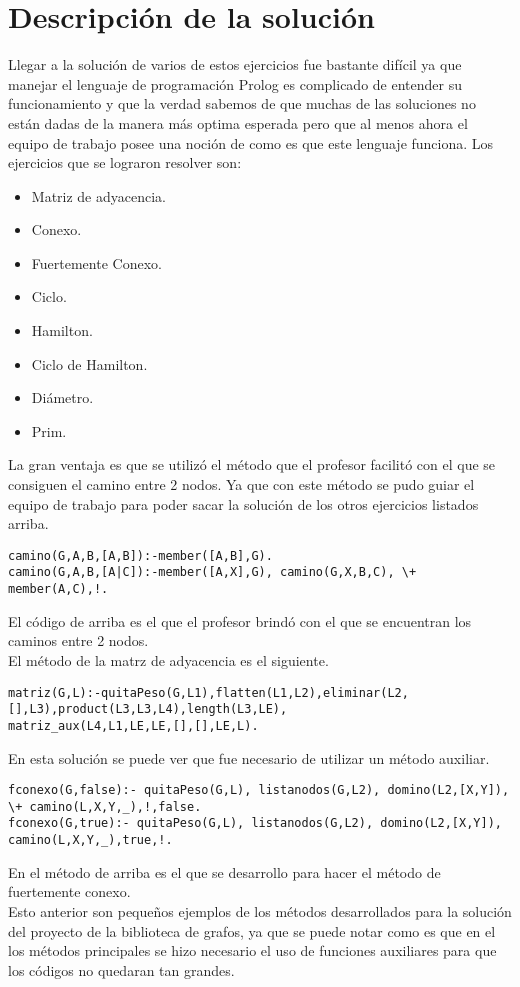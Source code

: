 \documentclass[10pt,a4paper]{article}
\begin{document}
\section{Descripción de la solución}
Llegar a la solución de varios de estos ejercicios fue bastante difícil ya que manejar el lenguaje de programación Prolog es complicado de entender su funcionamiento y que la verdad sabemos de que muchas de las soluciones no están dadas de la manera más optima esperada pero que al menos ahora el equipo de trabajo posee una noción de como es que este lenguaje funciona. Los ejercicios que se lograron resolver son:
\begin{itemize}
\item Matriz de adyacencia.
\item Conexo.
\item Fuertemente Conexo.
\item Ciclo.
\item Hamilton.
\item Ciclo de Hamilton.
\item Diámetro.
\item Prim.
\end{itemize}
La gran ventaja es que se utilizó el método que el profesor facilitó con el que se consiguen el camino entre 2 nodos. Ya que con este método se pudo guiar el equipo de trabajo para poder sacar la solución de los otros ejercicios listados arriba. 
\begin{verbatim}
camino(G,A,B,[A,B]):-member([A,B],G).
camino(G,A,B,[A|C]):-member([A,X],G), camino(G,X,B,C), \+ member(A,C),!.
\end{verbatim}
El código de arriba es el que el profesor brindó con el que se encuentran los caminos entre 2 nodos.\\
El método de la matrz de adyacencia es el siguiente.
\begin{verbatim}
matriz(G,L):-quitaPeso(G,L1),flatten(L1,L2),eliminar(L2,[],L3),product(L3,L3,L4),length(L3,LE),
matriz_aux(L4,L1,LE,LE,[],[],LE,L).
\end{verbatim}
En esta solución se puede ver que fue necesario de utilizar un método auxiliar. 
\begin{verbatim}
fconexo(G,false):- quitaPeso(G,L), listanodos(G,L2), domino(L2,[X,Y]), \+ camino(L,X,Y,_),!,false.
fconexo(G,true):- quitaPeso(G,L), listanodos(G,L2), domino(L2,[X,Y]),  camino(L,X,Y,_),true,!.
\end{verbatim}
En el método de arriba es el que se desarrollo para hacer el método de fuertemente conexo.\\
Esto anterior son pequeños ejemplos de los métodos desarrollados para la solución del proyecto de la biblioteca de grafos, ya que se puede notar como es que en el los métodos principales se hizo necesario el uso de funciones auxiliares para que los códigos no quedaran tan grandes.\\
\pagebreak
\end{document}
